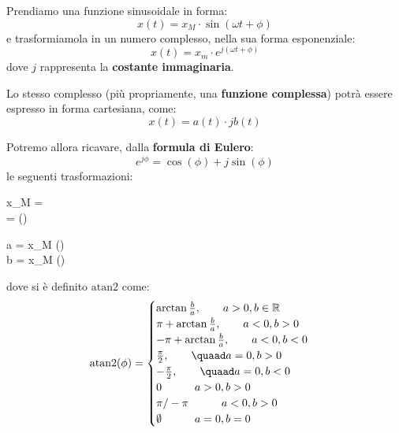 \documentclass[a4paper,11pt]{article}
\begin{document}
Prendiamo una funzione sinusoidale in forma:
$$
x(t) = x_M \cdot \sin (\omega t + \phi)
$$
e trasformiamola in un numero complesso, nella sua forma esponenziale:
$$
x(t) = x_m \cdot e^{j(\omega t + \phi)}
$$
dove $j$ rappresenta la \textbf{costante immaginaria}.

Lo stesso complesso (più propriamente, una \textbf{funzione complessa}) potrà essere espresso in forma cartesiana, come:
$$
x(t) = a(t) \cdot j b(t)
$$

Potremo allora ricavare, dalla \textbf{formula di Eulero}:
$$
e^{j\phi} = \cos(\phi) + j \sin(\phi)
$$
le seguenti trasformazioni:

\par\medskip

\noindent
\begin{minipage}{0.45\textwidth}
	\begin{center}
			\begin{cases}
				x_M =  \\ 
				\phi = 
					\left(\right)	
			\end{cases}
	\end{center}
\end{minipage}
\hfill
\begin{minipage}{0.45\textwidth}
	\begin{center}
			\begin{cases}
				a = x_M \cos(\phi) \\ 
				b = x_M \sin(\phi) \\ 
			\end{cases}
	\end{center}
\end{minipage}

dove si è definito $\mathrm{atan2}$ come:
$$
\mathrm{atan2}(\phi) =
	\begin{cases}
		\arctan{\frac{b}{a}}, \quad \quad a > 0, b \in \mathbb{R} \\ 
					\pi + \arctan{\frac{b}{a}}, \quad \quad a < 0, b > 0 \\ 
					- \pi + \arctan{\frac{b}{a}}, \quad \quad a < 0, b < 0 \\ 
					\frac{\pi}{2}, \quad \quad \quaad a = 0, b > 0 \\
					-\frac{\pi}{2}, \quad \quad \quaad a = 0, b < 0 \\
					0 \quad \quad \quad a > 0, b > 0 \\ 
					\pi / -\pi \quad \quad \quad a < 0, b > 0 \\
					\emptyset \quad \quad \quad a = 0, b = 0	
	\end{cases}
$$
\end{document}
